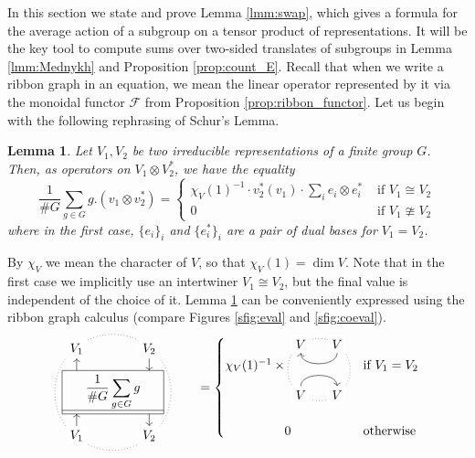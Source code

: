 \documentclass{amsart}
\newtheorem{lemma}[conjecture]{Lemma}
\begin{document}
In this section we state and prove Lemma \ref{lmm:swap}, which gives a formula for the average action of a subgroup on a tensor product of representations. It will be the key tool to compute sums over two-sided translates of subgroups in Lemma \ref{lmm:Mednykh} and Proposition \ref{prop:count_E}. Recall that when we write a ribbon graph in an equation, we mean the linear operator represented by it via the monoidal functor $\mathcal{F}$ from Proposition \ref{prop:ribbon_functor}. Let us begin with the following rephrasing of Schur's Lemma.
\begin{lemma}\label{lmm:swap_irr}
Let $V_1,V_2$ be two irreducible representations of a finite group $G$. Then, as operators on $V_1\otimes V_2^*$, we have the equality
\begin{equation*}
\frac{1}{\#G}\sum_{g\in G}g.(v_1\otimes v_2^*)=\begin{cases}\chi_V(1)^{-1}\cdot v_2^*(v_1)\cdot\sum_ie_i\otimes e_i^*&\text{ if }V_1\cong V_2\\0&\text{ if }V_1\ncong V_2\end{cases}
\end{equation*}
where in the first case, $\{e_i\}_i$ and $\{e_i^*\}_i$ are a pair of dual bases for $V_1=V_2$.
\end{lemma}
By $\chi_V$ we mean the character of $V$, so that $\chi_V(1)=\dim V$. Note that in the first case we implicitly use an intertwiner $V_1\cong V_2$, but the final value is independent of the choice of it. Lemma \ref{lmm:swap_irr} can be conveniently expressed using the ribbon graph calculus (compare Figures \ref{sfig:eval} and \ref{sfig:coeval}).
\begin{equation*}
\begin{tikzpicture}[baseline=.9]
\draw[dotted](0,0)circle(1.6);
\node[fill=white](li)at(-1,-1.2){$V_1$};\node[fill=white](lo)at(-1,1.2){$V_1$};\node[fill=white](ri)at(1,1.2){$V_2$};\node[fill=white](ro)at(1,-1.2){$V_2$};\node at(0,0){$\displaystyle\frac{1}{\#G}\sum_{g\in G}g$};
\draw(-1.4,.6)--(1.4,.6)--(1.4,-.6)--(-1.4,-.6)--(-1.4,.6)(-1.4,-.5)--(1.4,-.5);
\draw[->](li)--(-1,-.6);\draw[->](-1,.6)--(lo);\draw[->](ri)--(1,.6);\draw[->](1,-.6)--(ro);
\end{tikzpicture}
\qquad=\begin{cases}
\chi_V(1)^{-1}\times
\begin{tikzpicture}[baseline=.5]
\draw[dotted](0,0)circle(.86);
\node[fill=white](li)at(-.5,-.7){$V$};\node[fill=white](lo)at(-.5,.7){$V$};\node[fill=white](ri)at(.5,.7){$V$};\node[fill=white](ro)at(.5,-.7){$V$};
\draw[->](li)to[out=90,in=90](ro);\draw[->](ri)to[out=-90,in=-90](lo);
\end{tikzpicture}
&\text{if }V_1=V_2\\\ \\\hfill 0\hfill&\text{otherwise}
\end{cases}
\end{equation*}
\end{document}
